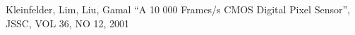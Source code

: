 \documentclass[paper,10pt,a4paper]{IEEEtran}
\begin{document}
\begin{thebibliography}{1}
  \providecommand{\url}[1]{#1}

  Kleinfelder, Lim, Liu, Gamal ``A 10 000 Frames/s CMOS Digital Pixel Sensor'',
  JSSC, VOL 36, NO 12, 2001




\end{thebibliography}
\end{document}
